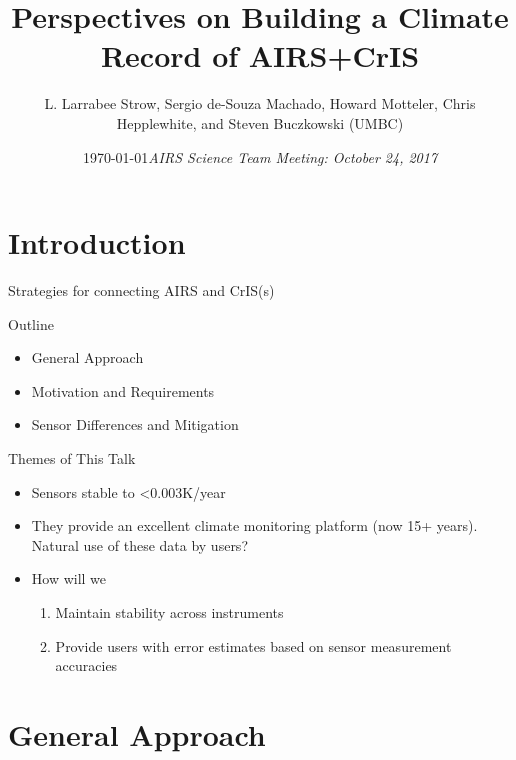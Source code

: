 \documentclass[10pt,t]{beamer}
\author{L. Larrabee Strow, Sergio de-Souza Machado, Howard Motteler, Chris Hepplewhite, and Steven Buczkowski (UMBC)}
\date{\today}
\title{Perspectives on Building a Climate Record of AIRS+CrIS}
\date{\textit{AIRS Science Team Meeting:  \footnotesize October 24, 2017}}
\begin{document}
\maketitle
{}

\section{Introduction}
\label{sec:org047a7d5}

\begin{frame}[label={sec:org648c8cc}]{Strategies for connecting AIRS and CrIS(s)}
\begin{block}{Outline}
\begin{itemize}
\item General Approach
\item Motivation and Requirements
\item Sensor Differences and Mitigation
\end{itemize}
\end{block}
\begin{block}{Themes of This Talk}
\begin{itemize}
\item Sensors stable to  <0.003K/year
\item They provide an excellent climate monitoring platform (now 15+ years).  Natural use of these data by users?
\item How will we 
\begin{enumerate}
\item Maintain stability across instruments
\item Provide users with error estimates based on sensor measurement accuracies
\end{enumerate}
\end{itemize}
\end{block}
\end{frame}


\section{General Approach}
\label{sec:orga4ad907}
\end{document}
